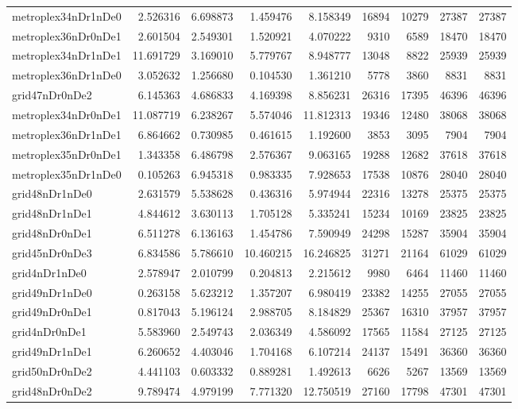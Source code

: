 \begin{longtable}{|l|r|r|r|r|r|r|r|r|}
metroplex34nDr1nDe0 & 2.526316 & 6.698873 & 1.459476 & 8.158349 & 16894 & 10279 & 27387 & 27387 \\
metroplex36nDr0nDe1 & 2.601504 & 2.549301 & 1.520921 & 4.070222 & 9310 & 6589 & 18470 & 18470 \\
metroplex34nDr1nDe1 & 11.691729 & 3.169010 & 5.779767 & 8.948777 & 13048 & 8822 & 25939 & 25939 \\
metroplex36nDr1nDe0 & 3.052632 & 1.256680 & 0.104530 & 1.361210 & 5778 & 3860 & 8831 & 8831 \\
grid47nDr0nDe2 & 6.145363 & 4.686833 & 4.169398 & 8.856231 & 26316 & 17395 & 46396 & 46396 \\
metroplex34nDr0nDe1 & 11.087719 & 6.238267 & 5.574046 & 11.812313 & 19346 & 12480 & 38068 & 38068 \\
metroplex36nDr1nDe1 & 6.864662 & 0.730985 & 0.461615 & 1.192600 & 3853 & 3095 & 7904 & 7904 \\
metroplex35nDr0nDe1 & 1.343358 & 6.486798 & 2.576367 & 9.063165 & 19288 & 12682 & 37618 & 37618 \\
metroplex35nDr1nDe0 & 0.105263 & 6.945318 & 0.983335 & 7.928653 & 17538 & 10876 & 28040 & 28040 \\
grid48nDr1nDe0 & 2.631579 & 5.538628 & 0.436316 & 5.974944 & 22316 & 13278 & 25375 & 25375 \\
grid48nDr1nDe1 & 4.844612 & 3.630113 & 1.705128 & 5.335241 & 15234 & 10169 & 23825 & 23825 \\
grid48nDr0nDe1 & 6.511278 & 6.136163 & 1.454786 & 7.590949 & 24298 & 15287 & 35904 & 35904 \\
grid45nDr0nDe3 & 6.834586 & 5.786610 & 10.460215 & 16.246825 & 31271 & 21164 & 61029 & 61029 \\
grid4nDr1nDe0 & 2.578947 & 2.010799 & 0.204813 & 2.215612 & 9980 & 6464 & 11460 & 11460 \\
grid49nDr1nDe0 & 0.263158 & 5.623212 & 1.357207 & 6.980419 & 23382 & 14255 & 27055 & 27055 \\
grid49nDr0nDe1 & 0.817043 & 5.196124 & 2.988705 & 8.184829 & 25367 & 16310 & 37957 & 37957 \\
grid4nDr0nDe1 & 5.583960 & 2.549743 & 2.036349 & 4.586092 & 17565 & 11584 & 27125 & 27125 \\
grid49nDr1nDe1 & 6.260652 & 4.403046 & 1.704168 & 6.107214 & 24137 & 15491 & 36360 & 36360 \\
grid50nDr0nDe2 & 4.441103 & 0.603332 & 0.889281 & 1.492613 & 6626 & 5267 & 13569 & 13569 \\
grid48nDr0nDe2 & 9.789474 & 4.979199 & 7.771320 & 12.750519 & 27160 & 17798 & 47301 & 47301 \\

\end{longtable}
